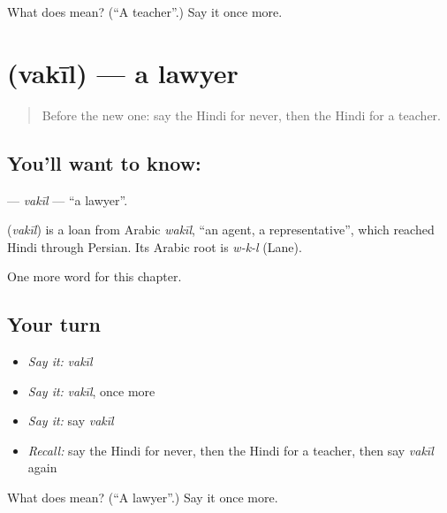 \begin{tcolorbox}[breakable,colback=teal!4,colframe=teal!35!black,title={Before you move on}]
What does  mean? (\textquotedblleft{}A teacher\textquotedblright{}.) Say it once more.
\end{tcolorbox}
\section[\texorpdfstring{\hi{वकील} (vakīl)}{वकील (vakīl)}]{ (vakīl) — a lawyer}

\label{lesson:HI-C193-vakil}



\begin{quote}
Before the new one: say the Hindi for never, then the Hindi for a teacher.
\end{quote}

\subsection*{You'll want to know: }
\textbf{} — \emph{vakīl} — \textquotedblleft{}a lawyer\textquotedblright{}.

\begin{cousinweb}
\textbf{} (\emph{vakīl}) is a loan from Arabic \emph{wakīl}, \textquotedblleft{}an agent, a representative\textquotedblright{}, which reached Hindi through Persian. Its Arabic root is \emph{w-k-l} (Lane).
\end{cousinweb}

\begin{grammarlens}[title={What you've built}]
One more word for this chapter.
\end{grammarlens}

\subsection*{Your turn}
\begin{itemize}
\raggedright
  \item \emph{Say it:} \emph{vakīl}
  \item \emph{Say it:} \emph{vakīl}, once more
  \item \emph{Say it:} say \emph{vakīl}
  \item \emph{Recall:} say the Hindi for never, then the Hindi for a teacher, then say \emph{vakīl} again
\end{itemize}

\begin{tcolorbox}[breakable,colback=teal!4,colframe=teal!35!black,title={Before you move on}]
What does  mean? (\textquotedblleft{}A lawyer\textquotedblright{}.) Say it once more.
\end{tcolorbox}
